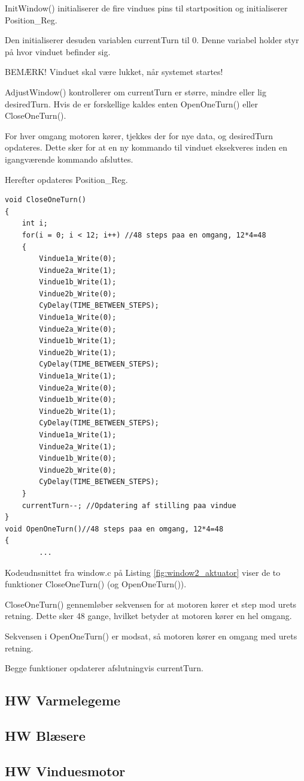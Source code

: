 InitWindow() initialiserer de fire vindues pins til startposition og initialiserer Position\_Reg. 

Den initialiserer desuden variablen currentTurn til 0. Denne variabel holder styr på hvor vinduet befinder sig. 

BEMÆRK! Vinduet skal være lukket, når systemet startes!

AdjustWindow() kontrollerer om currentTurn er større, mindre eller lig desiredTurn. Hvis de er forskellige kaldes enten OpenOneTurn() eller CloseOneTurn(). 

For hver omgang motoren kører, tjekkes der for nye data, og desiredTurn opdateres. Dette sker for at en ny kommando til vinduet eksekveres inden en igangværende kommando afsluttes.

Herefter opdateres Position\_Reg.
\newline
\begin{lstlisting}[caption=Udsnit B af window.c for PSoC4 i Aktuator, label=fig:window2_aktuator]
void CloseOneTurn()
{
    int i;
    for(i = 0; i < 12; i++) //48 steps paa en omgang, 12*4=48
    {
        Vindue1a_Write(0);
        Vindue2a_Write(1);
        Vindue1b_Write(1);
        Vindue2b_Write(0);
        CyDelay(TIME_BETWEEN_STEPS);
        Vindue1a_Write(0);
        Vindue2a_Write(0);
        Vindue1b_Write(1);
        Vindue2b_Write(1);
        CyDelay(TIME_BETWEEN_STEPS);
        Vindue1a_Write(1);
        Vindue2a_Write(0);
        Vindue1b_Write(0);
        Vindue2b_Write(1);
        CyDelay(TIME_BETWEEN_STEPS);
        Vindue1a_Write(1);
        Vindue2a_Write(1);
        Vindue1b_Write(0);
        Vindue2b_Write(0);
        CyDelay(TIME_BETWEEN_STEPS);
    }
    currentTurn--; //Opdatering af stilling paa vindue
}
void OpenOneTurn()//48 steps paa en omgang, 12*4=48
{
        ...
\end{lstlisting}

Kodeudnsnittet fra window.c på Listing \ref{fig:window2_aktuator} viser de to funktioner CloseOneTurn() (og OpenOneTurn()). 

CloseOneTurn() gennemløber sekvensen for at motoren kører et step mod urets retning. Dette sker 48 gange, hvilket betyder at motoren kører en hel omgang. 

Sekvensen i OpenOneTurn() er modsat, så motoren kører en omgang med urets retning. 

Begge funktioner opdaterer afslutningvis currentTurn. 

\clearpage

\subsection{HW Varmelegeme}

\subsection{HW Blæsere}

\subsection{HW Vinduesmotor}
